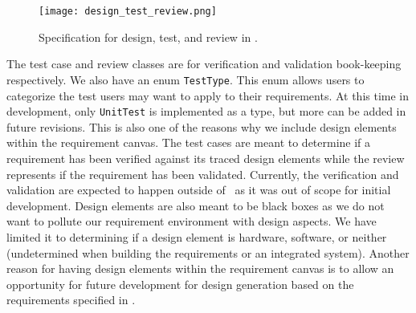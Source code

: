 \begin{figure}[hbt!]
	\centering
	\texttt{[image: design\_test\_review.png]}
	\caption{Specification for design, test, and review in \tool.}
	\label{fig:design_test_review}
\end{figure}

The test case and review classes are for verification and validation book-keeping respectively. We also have an enum \texttt{TestType}. This enum allows users to categorize the test users may want to apply to their requirements. At this time in development, only \texttt{UnitTest} is implemented as a type, but more can be added in future revisions. This is also one of the reasons why we include design elements within the requirement canvas. The test cases are meant to determine if a requirement has been verified against its traced design elements while the review represents if the requirement has been validated. Currently, the verification and validation are expected to happen outside of \tool\ as it was out of scope for initial development. Design elements are also meant to be black boxes as we do not want to pollute our requirement environment with design aspects. We have limited it to determining if a design element is hardware, software, or neither (undetermined when building the requirements or an integrated system). Another reason for having design elements within the requirement canvas is to allow an opportunity for future development for design generation based on the requirements specified in \tool.





